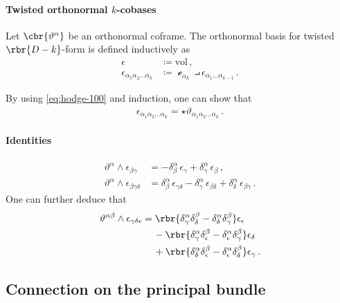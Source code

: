 \documentclass[a4paper]{article}
\begin{document}
\paragraph{Twisted orthonormal $k$-cobases}
Let $\cbr{\vartheta^{\alpha}}$ be an orthonormal coframe. The orthonormal 
basis for twisted $\rbr{D-k}$-form is defined inductively as
\begin{align}
\epsilon &\coloneqq \mathrm{vol}\,, \\
\epsilon_{\alpha_{1}\alpha_{2}\ldots \alpha_{k}} &\coloneqq
\mscre_{\alpha_{k}} \intprod \epsilon_{\alpha_{1}\ldots \alpha_{k-1}}\,.
\end{align}

By using \cref{eq:hodge-100} and induction, one can show that
\begin{align}
\epsilon_{\alpha_{1}\alpha_{2}\ldots \alpha_{k}} =
\star \vartheta_{\alpha_{1}\alpha_{2}\ldots \alpha_{k}}\,.
\end{align}

\paragraph{Identities}

\begin{align}
\vartheta^{\alpha}\wedge\epsilon_{\beta\gamma}
&= -\delta^{\alpha}_{\beta}\,\epsilon_{\gamma}
	+\delta^{\alpha}_{\gamma}\,\epsilon_{\beta}\,,
\\
\vartheta^{\alpha}\wedge\epsilon_{\beta\gamma\delta} &=
\delta^{\alpha}_{\beta}\,\epsilon_{\gamma\delta} -
\delta^{\alpha}_{\gamma}\,\epsilon_{\beta\delta} +
\delta^{\alpha}_{\delta}\,\epsilon_{\beta\gamma}\,.
\end{align}
One can further deduce that
\begin{align}
\begin{split}
\vartheta^{\alpha\beta}\wedge\epsilon_{\gamma\delta\epsilon} &=
\rbr{\delta^{\alpha}_{\gamma}\delta^{\beta}_{\delta}-
	\delta^{\alpha}_{\delta}\delta^{\beta}_{\gamma}}\epsilon_{\epsilon}
\\
&\quad\, -
\rbr{\delta^{\alpha}_{\gamma}\delta^{\beta}_{\epsilon}-
	\delta^{\alpha}_{\epsilon}\delta^{\beta}_{\gamma}}\epsilon_{\delta}
\\
&\quad\, +
\rbr{\delta^{\alpha}_{\delta}\delta^{\beta}_{\epsilon}-
	\delta^{\alpha}_{\epsilon}\delta^{\beta}_{\delta}}\epsilon_{\gamma}\,.
\end{split}
\end{align}

\subsection{Connection on the principal bundle}
\end{document}
